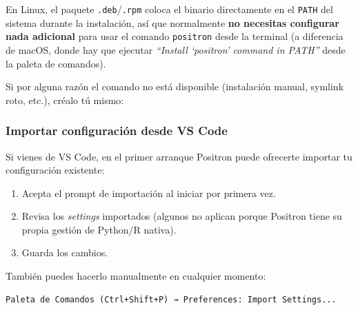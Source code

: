\documentclass[
  doc,
  floatsintext,
  longtable,
  a4paper,
  nolmodern,
  notxfonts,
  notimes,
  12pt,
  colorlinks=true,linkcolor=blue,citecolor=blue,urlcolor=blue]{apa7}
\newenvironment{Shaded}{\begin{snugshade}}{\end{snugshade}}
\newcommand{\AttributeTok}[1]{\textcolor[rgb]{0.40,0.45,0.13}{#1}}
\newcommand{\BuiltInTok}[1]{\textcolor[rgb]{0.00,0.23,0.31}{#1}}
\newcommand{\CommentTok}[1]{\textcolor[rgb]{0.37,0.37,0.37}{#1}}
\newcommand{\FunctionTok}[1]{\textcolor[rgb]{0.28,0.35,0.67}{#1}}
\newcommand{\NormalTok}[1]{\textcolor[rgb]{0.00,0.23,0.31}{#1}}
\newcommand{\OperatorTok}[1]{\textcolor[rgb]{0.37,0.37,0.37}{#1}}
\newcommand{\StringTok}[1]{\textcolor[rgb]{0.13,0.47,0.30}{#1}}
\providecommand{\tightlist}{%
  \setlength{\itemsep}{0pt}\setlength{\parskip}{0pt}}
\begin{document}
En Linux, el paquete \texttt{.deb}/\texttt{.rpm} coloca el binario
directamente en el \texttt{PATH} del sistema durante la instalación, así
que normalmente \textbf{no necesitas configurar nada adicional} para
usar el comando \texttt{positron} desde la terminal (a diferencia de
macOS, donde hay que ejecutar \emph{``Install `positron' command in
PATH''} desde la paleta de comandos).

Si por alguna razón el comando no está disponible (instalación manual,
symlink roto, etc.), créalo tú mismo:

\begin{Shaded}
\end{Shaded}

\subsubsection{Importar configuración desde VS
Code}\label{importar-configuraciuxf3n-desde-vs-code}

Si vienes de VS Code, en el primer arranque Positron puede ofrecerte
importar tu configuración existente:

\begin{enumerate}
\def\labelenumi{\arabic{enumi}.}
\tightlist
\item
  Acepta el prompt de importación al iniciar por primera vez.
\item
  Revisa los \emph{settings} importados (algunos no aplican porque
  Positron tiene su propia gestión de Python/R nativa).
\item
  Guarda los cambios.
\end{enumerate}

También puedes hacerlo manualmente en cualquier momento:

\begin{verbatim}
Paleta de Comandos (Ctrl+Shift+P) → Preferences: Import Settings...
\end{verbatim}
\end{document}
